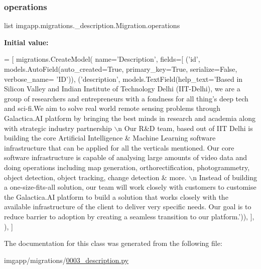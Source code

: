 \subsubsection{\texorpdfstring{operations}{operations}}
{\footnotesize\ttfamily list imgapp.\+migrations.\+\_\+description.\+Migration.\+operations\hspace{0.3cm}{\ttfamily [static]}}

{\bfseries Initial value\+:}
\begin{DoxyCode}
=  [
        migrations.CreateModel(
            name=\textcolor{stringliteral}{'Description'},
            fields=[
                (\textcolor{stringliteral}{'id'}, models.AutoField(auto\_created=\textcolor{keyword}{True}, primary\_key=\textcolor{keyword}{True}, serialize=\textcolor{keyword}{False}, verbose\_name=\textcolor{stringliteral}{
      'ID'})),
                (\textcolor{stringliteral}{'description'}, models.TextField(help\_text=\textcolor{stringliteral}{'Based in Silicon Valley and Indian Institute of
       Technology Delhi (IIT-Delhi), we are a group of researchers and entrepreneurs with a fondness for all
       thing’s deep tech and sci-fi.We aim to solve real world remote sensing problems through Galactica.AI platform by
       bringing the best minds in research and academia along with strategic industry partnership \(\backslash\)n Our R&D team,
       based out of IIT Delhi is building the core Artificial Intelligence & Machine Learning software
       infrastructure that can be applied for all the verticals mentioned. Our core software infrastructure is capable of
       analysing large amounts of video data and doing operations including map generation, orthorectification,
       photogrammetry, object detection, object tracking, change detection & more. \(\backslash\)n Instead of building a
       one-size-fits-all solution, our team will work closely with customers to customise the Galactica.AI platform to build a
       solution that works closely with the available infrastructure of the client to deliver very specific needs. Our
       goal is to reduce barrier to adoption by creating a seamless transition to our platform.'})),
            ],
        ),
    ]
\end{DoxyCode}


The documentation for this class was generated from the following file\+:\begin{DoxyCompactItemize}
\item 
imgapp/migrations/\hyperlink{0003__description_8py}{0003\+\_\+description.\+py}\end{DoxyCompactItemize}
